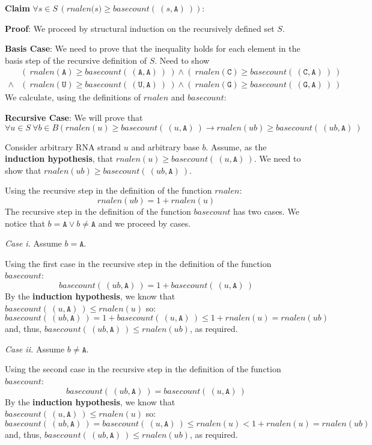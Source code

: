 \documentclass[12pt, oneside]{article}
\newcommand{\A}[0]{\texttt{A}}
\newcommand{\C}[0]{\texttt{C}}
\newcommand{\G}[0]{\texttt{G}}
\newcommand{\U}[0]{\texttt{U}}
\begin{document}
{\bf Claim} $\forall s \in S \, (\textit{rnalen(s)} \geq \textit{basecount}(~(s, \A)~))$:

{\bf Proof}: We proceed by structural induction on the recursively defined set $S$.

{\bf Basis  Case}: We need to prove that 
the inequality holds for each element in the basis step of the recursive
definition of $S$. 
Need to show 
\begin{align*}
          &(~ rnalen(\A) \geq basecount(~(\A, \A)~)~) \land (~ rnalen(\C) \geq basecount(~(\C, \A)~)~) \\
    \land & (~ rnalen(\U) \geq basecount(~(\U, \A)~)~) \land (~ rnalen(\G) \geq basecount(~(\G, \A)~)~)
\end{align*}
We calculate, using the definitions of $rnalen$ and $basecount$:

\vspace{100pt}

{\bf Recursive Case}: We will prove that 
\[
    \forall u \in S ~\forall b \in B ~( ~rnalen(u) \geq basecount(~(u, \A)~) \to 
    rnalen(ub) \geq basecount(~(ub, \A)~)
\]

Consider arbitrary RNA strand $u$ and arbitrary base $b$. Assume, as the {\bf induction hypothesis},
that $rnalen(u) \geq basecount(~(u,\A)~)$. We need to show that $rnalen(ub) \geq basecount(~(ub, \A)~)$.

Using the recursive step in the definition of the function $rnalen$:
\[
    rnalen(ub) = 1 + rnalen(u)
\]
The recursive step in the definition of the function $basecount$ has two cases. We notice that 
$b = \A \lor b \neq \A$ and we proceed by cases.

{\it Case i.} Assume $b = \A$.

Using the first case in the recursive step in the definition of the function $basecount$:
\[
    basecount(~(ub, \A)~) = 1 + basecount(~(u,\A)~)
\]
By the {\bf induction hypothesis}, we know that $basecount(~(u,\A)~) \leq rnalen(u)$ so:
\[
    basecount(~(ub, \A)~) = 1 + basecount(~(u,\A)~) \leq 1 + rnalen(u) = rnalen (ub)
\]
and, thus, $basecount(~(ub,\A)~) \leq rnalen(ub)$, as required.

{\it Case ii.} Assume $b \neq \A$. 

Using the second case in the recursive step in the definition of the function $basecount$:
\[
    basecount(~(ub, \A)~) = basecount(~(u,\A)~)
\]
By the {\bf induction hypothesis}, we know that $basecount(~(u,\A)~) \leq rnalen(u)$ so:
\[
    basecount(~(ub, \A)~) = basecount(~(u,\A)~) \leq rnalen(u) < 1 + rnalen(u) = rnalen (ub)
\]
and, thus, $basecount(~(ub,\A)~) \leq rnalen(ub)$, as required.
 \newpage
\end{document}
